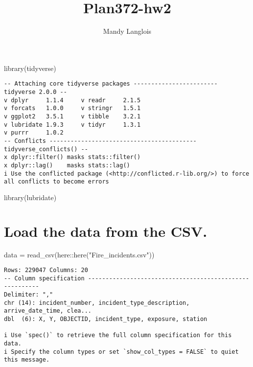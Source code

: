 \documentclass[
  letterpaper,
  DIV=11,
  numbers=noendperiod]{scrartcl}
\title{Plan372-hw2}
\author{Mandy Langlois}
\date{}
\newenvironment{Shaded}{\begin{snugshade}}{\end{snugshade}}
\newcommand{\FunctionTok}[1]{\textcolor[rgb]{0.28,0.35,0.67}{#1}}
\newcommand{\NormalTok}[1]{\textcolor[rgb]{0.00,0.23,0.31}{#1}}
\newcommand{\OtherTok}[1]{\textcolor[rgb]{0.00,0.23,0.31}{#1}}
\newcommand{\SpecialCharTok}[1]{\textcolor[rgb]{0.37,0.37,0.37}{#1}}
\newcommand{\StringTok}[1]{\textcolor[rgb]{0.13,0.47,0.30}{#1}}
\begin{document}
\maketitle

\begin{Shaded}
\begin{Highlighting}[]
\FunctionTok{library}\NormalTok{(tidyverse)}
\end{Highlighting}
\end{Shaded}

\begin{verbatim}
-- Attaching core tidyverse packages ------------------------ tidyverse 2.0.0 --
v dplyr     1.1.4     v readr     2.1.5
v forcats   1.0.0     v stringr   1.5.1
v ggplot2   3.5.1     v tibble    3.2.1
v lubridate 1.9.3     v tidyr     1.3.1
v purrr     1.0.2     
-- Conflicts ------------------------------------------ tidyverse_conflicts() --
x dplyr::filter() masks stats::filter()
x dplyr::lag()    masks stats::lag()
i Use the conflicted package (<http://conflicted.r-lib.org/>) to force all conflicts to become errors
\end{verbatim}

\begin{Shaded}
\begin{Highlighting}[]
\FunctionTok{library}\NormalTok{(lubridate)}
\end{Highlighting}
\end{Shaded}

\section{Load the data from the CSV.}\label{load-the-data-from-the-csv.}

\begin{Shaded}
\begin{Highlighting}[]
\NormalTok{data }\OtherTok{=} \FunctionTok{read\_csv}\NormalTok{(here}\SpecialCharTok{::}\FunctionTok{here}\NormalTok{(}\StringTok{"Fire\_incidents.csv"}\NormalTok{))}
\end{Highlighting}
\end{Shaded}

\begin{verbatim}
Rows: 229047 Columns: 20
-- Column specification --------------------------------------------------------
Delimiter: ","
chr (14): incident_number, incident_type_description, arrive_date_time, clea...
dbl  (6): X, Y, OBJECTID, incident_type, exposure, station

i Use `spec()` to retrieve the full column specification for this data.
i Specify the column types or set `show_col_types = FALSE` to quiet this message.
\end{verbatim}
\end{document}
